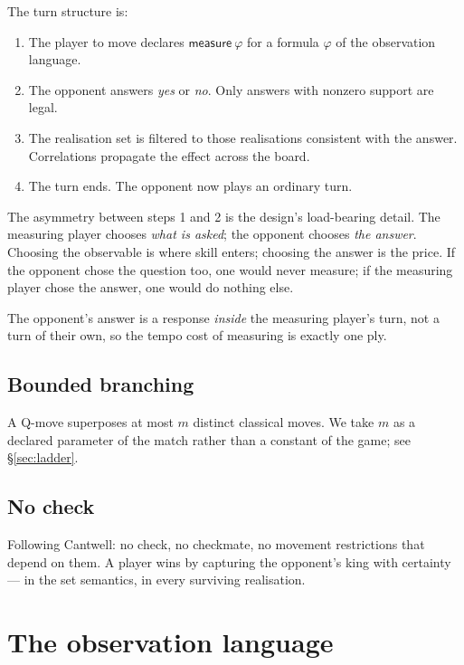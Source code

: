 \documentclass[11pt,a4paper]{article}
\theoremstyle{definition}
\theoremstyle{plain}
\newcommand{\Meas}{\textsf{measure}}
\begin{document}
The turn structure is:

\begin{enumerate}[leftmargin=1.6em]
\item The player to move declares $\Meas\ \varphi$ for a formula $\varphi$ of
      the observation language.
\item The opponent answers \emph{yes} or \emph{no}. Only answers with nonzero
      support are legal.
\item The realisation set is filtered to those realisations consistent with the
      answer. Correlations propagate the effect across the board.
\item The turn ends. The opponent now plays an ordinary turn.
\end{enumerate}

The asymmetry between steps 1 and 2 is the design's load-bearing detail. The
measuring player chooses \emph{what is asked}; the opponent chooses \emph{the
answer}. Choosing the observable is where skill enters; choosing the answer is
the price. If the opponent chose the question too, one would never measure; if
the measuring player chose the answer, one would do nothing else.

The opponent's answer is a response \emph{inside} the measuring player's turn,
not a turn of their own, so the tempo cost of measuring is exactly one ply.

\subsection{Bounded branching}

A Q-move superposes at most $m$ distinct classical moves. We take $m$ as a
declared parameter of the match rather than a constant of the game; see
\S\ref{sec:ladder}.

\subsection{No check}

Following Cantwell: no check, no checkmate, no movement restrictions that
depend on them. A player wins by capturing the opponent's king with certainty
--- in the set semantics, in every surviving realisation.

\section{The observation language}
\label{sec:obs}
\end{document}
